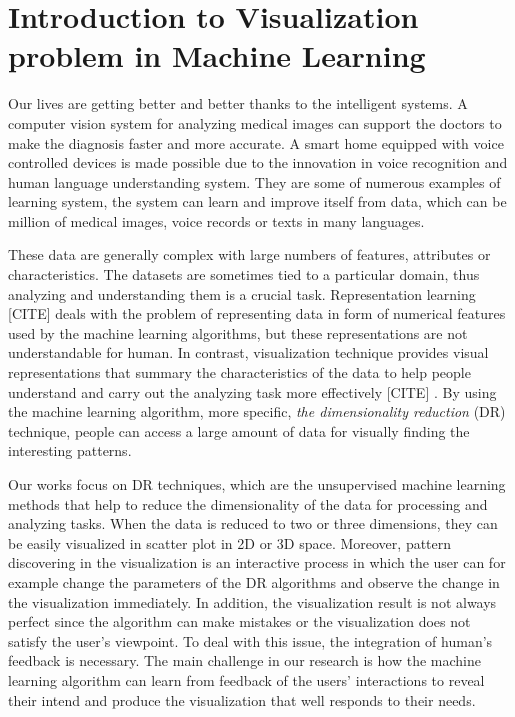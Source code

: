 \section{Introduction to Visualization problem in Machine Learning}

Our lives are getting better and better thanks to the intelligent systems.
A computer vision system for analyzing medical images can support the doctors to make the diagnosis faster and more accurate.
A smart home equipped with voice controlled devices is made possible due to the innovation in voice recognition and human language understanding system.
They are some of numerous examples of learning system, the system can learn and improve itself from data, which can be million of medical images, voice records or texts in many languages.

These data are generally complex with large numbers of features, attributes or characteristics.
The datasets are sometimes tied to a particular domain, thus analyzing and understanding them is a crucial task.
Representation learning [CITE] deals with the problem of representing data in form of numerical features used by the machine learning algorithms, but these representations are not understandable for human.
In contrast, visualization technique provides visual representations that summary the characteristics of the data to help people understand and carry out the analyzing task more effectively [CITE] .
By using the machine learning algorithm, more specific, \emph{the dimensionality reduction} (DR) technique, people can access a large amount of data for visually finding the interesting patterns.

Our works focus on DR techniques, which are the unsupervised machine learning methods that help to reduce the dimensionality of the data for processing and analyzing tasks.
When the data is reduced to two or three dimensions, they can be easily visualized in scatter plot in 2D or 3D space.
Moreover, pattern discovering in the visualization is an interactive process in which the user can for example change the parameters of the DR algorithms and observe the change in the visualization immediately.
In addition, the visualization result is not always perfect since the algorithm can make mistakes or the visualization does not satisfy the user's viewpoint. To deal with this issue, the integration of human's feedback is necessary.
The main challenge in our research is how the machine learning algorithm can learn from feedback of the users' interactions to reveal their intend and produce the visualization that well responds to their needs.

